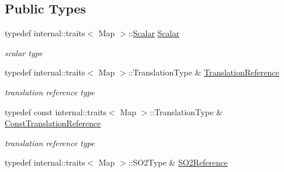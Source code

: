 \subsection*{Public Types}
\begin{DoxyCompactItemize}
\item 
typedef internal\+::traits$<$ Map $>$\+::\hyperlink{class_eigen_1_1_map_3_01_sophus_1_1_s_e2_group_3_01___scalar_01_4_00_01___options_01_4_a786250298fc0362636d913ce5b96894c}{Scalar} \hyperlink{class_eigen_1_1_map_3_01_sophus_1_1_s_e2_group_3_01___scalar_01_4_00_01___options_01_4_a786250298fc0362636d913ce5b96894c}{Scalar}\hypertarget{class_eigen_1_1_map_3_01_sophus_1_1_s_e2_group_3_01___scalar_01_4_00_01___options_01_4_a786250298fc0362636d913ce5b96894c}{}\label{class_eigen_1_1_map_3_01_sophus_1_1_s_e2_group_3_01___scalar_01_4_00_01___options_01_4_a786250298fc0362636d913ce5b96894c}

\begin{DoxyCompactList}\small\item\em scalar type \end{DoxyCompactList}\item 
typedef internal\+::traits$<$ Map $>$\+::Translation\+Type \& \hyperlink{class_eigen_1_1_map_3_01_sophus_1_1_s_e2_group_3_01___scalar_01_4_00_01___options_01_4_a7d845300d37b519b0730cc5ac098f2f2}{Translation\+Reference}\hypertarget{class_eigen_1_1_map_3_01_sophus_1_1_s_e2_group_3_01___scalar_01_4_00_01___options_01_4_a7d845300d37b519b0730cc5ac098f2f2}{}\label{class_eigen_1_1_map_3_01_sophus_1_1_s_e2_group_3_01___scalar_01_4_00_01___options_01_4_a7d845300d37b519b0730cc5ac098f2f2}

\begin{DoxyCompactList}\small\item\em translation reference type \end{DoxyCompactList}\item 
typedef const internal\+::traits$<$ Map $>$\+::Translation\+Type \& \hyperlink{class_eigen_1_1_map_3_01_sophus_1_1_s_e2_group_3_01___scalar_01_4_00_01___options_01_4_ab7bffb4711a188629b17ae3cb3c03a49}{Const\+Translation\+Reference}\hypertarget{class_eigen_1_1_map_3_01_sophus_1_1_s_e2_group_3_01___scalar_01_4_00_01___options_01_4_ab7bffb4711a188629b17ae3cb3c03a49}{}\label{class_eigen_1_1_map_3_01_sophus_1_1_s_e2_group_3_01___scalar_01_4_00_01___options_01_4_ab7bffb4711a188629b17ae3cb3c03a49}

\begin{DoxyCompactList}\small\item\em translation reference type \end{DoxyCompactList}\item 
typedef internal\+::traits$<$ Map $>$\+::S\+O2\+Type \& \hyperlink{class_eigen_1_1_map_3_01_sophus_1_1_s_e2_group_3_01___scalar_01_4_00_01___options_01_4_aa02197afddb3c3f212fa6f89b19aea6c}{S\+O2\+Reference}\hypertarget{class_eigen_1_1_map_3_01_sophus_1_1_s_e2_group_3_01___scalar_01_4_00_01___options_01_4_aa02197afddb3c3f212fa6f89b19aea6c}{}\label{class_eigen_1_1_map_3_01_sophus_1_1_s_e2_group_3_01___scalar_01_4_00_01___options_01_4_aa02197afddb3c3f212fa6f89b19aea6c}


\end{DoxyCompactItemize}
